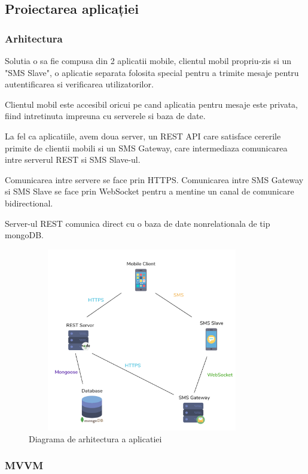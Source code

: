 \documentclass[12pt]{article}
\begin{document}
\newpage
\subsection{Proiectarea aplicației}
\subsubsection{Arhitectura}

Solutia o sa fie compusa din 2 aplicatii mobile, clientul mobil propriu-zis
si un "SMS Slave", o aplicatie separata folosita special pentru a trimite mesaje
pentru autentificarea si verificarea utilizatorilor.

Clientul mobil este accesibil oricui pe cand aplicatia pentru mesaje este privata,
fiind intretinuta impreuna cu serverele si baza de date.

La fel ca aplicatiile, avem doua server, un REST API care satisface cererile primite
de clientii mobili si un SMS Gateway, care intermediaza comunicarea intre serverul REST
si SMS Slave-ul.

Comunicarea intre servere se face prin HTTPS.
Comunicarea intre SMS Gateway si SMS Slave se face prin WebSocket pentru a mentine
un canal de comunicare bidirectional.

Server-ul REST comunica direct cu o baza de date  nonrelationala de tip mongoDB.

\begin{figure}[H]
    \centering
    \includegraphics[width=10cm, height=8cm]{arhi.png}
    \caption{Diagrama de arhitectura a aplicatiei}
    \end{figure}

\subsubsection{MVVM}
\end{document}
